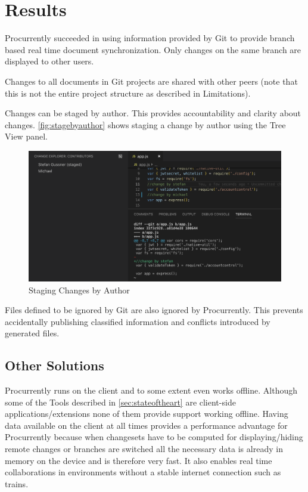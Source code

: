\section{Results}
Procurrently succeeded in using information provided by Git to provide branch based real time document synchronization. Only changes on the same branch are displayed to other users.

Changes to all documents in Git projects are shared with other peers (note that this is not the entire project structure as described in Limitations).

Changes can be staged by author. This provides accountability and clarity about changes. \autoref{fig:stagebyauthor} shows staging a change by author using the Tree View panel. 

\begin{figure}[hb]
    \centering
    \includegraphics[width=150mm]{figures/screenshots/stage-by-author.png}
	\caption{Staging Changes by Author}
    \label{fig:stagebyauthor}
\end{figure}

Files defined to be ignored by Git are also ignored by Procurrently. This prevents accidentally publishing classified information and conflicts introduced by generated files. 

\subsection{Other Solutions}
Procurrently runs on the client and to some extent even works offline. Although some of the Tools described in \autoref{sec:stateoftheart} are client-side applications/extensions none of them provide support working offline. Having data available on the client at all times provides a performance advantage for Procurrently because when changesets have to be computed for displaying/hiding remote changes or branches are switched all the necessary data is already in memory on the device and is therefore very fast. It also enables real time collaborations in environments without a stable internet connection such as trains.

